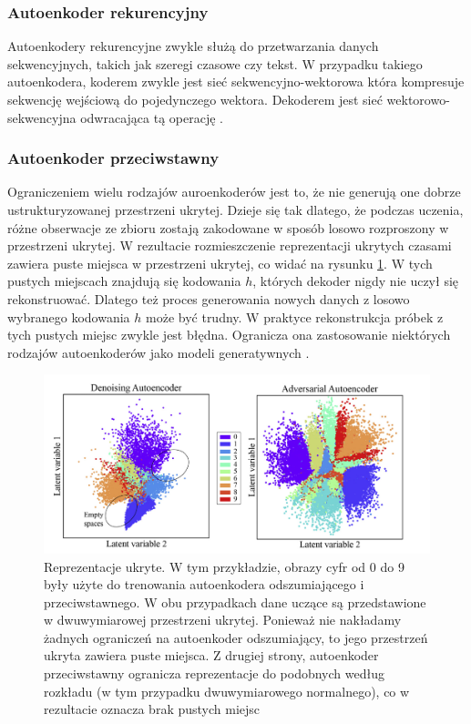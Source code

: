 \documentclass[12pt]{mwbk}
\theoremstyle{plain}
\theoremstyle{definition}
\theoremstyle{remark}
\newcommand\zrodlo[1]{\par\vspace{-3mm}{\small\textit{Źródło: }#1 }}
\begin{document}
\subsubsection{Autoenkoder rekurencyjny}

Autoenkodery rekurencyjne zwykle służą do przetwarzania danych sekwencyjnych, takich jak szeregi czasowe czy tekst. W przypadku takiego autoenkodera, koderem zwykle jest sieć sekwencyjno-wektorowa która kompresuje sekwencję wejściową do pojedynczego wektora. Dekoderem jest sieć wektorowo-sekwencyjna odwracająca tą operację \cite{geron}.






\subsubsection{Autoenkoder przeciwstawny}



Ograniczeniem wielu rodzajów auroenkoderów jest to, że nie generują one dobrze ustrukturyzowanej przestrzeni ukrytej. Dzieje się tak dlatego, że podczas uczenia, różne obserwacje ze zbioru zostają zakodowane w sposób losowo rozproszony w przestrzeni ukrytej. W rezultacie rozmieszczenie reprezentacji ukrytych czasami zawiera puste miejsca w przestrzeni ukrytej, co widać na rysunku \ref{fig:latent-spaces}. W tych pustych miejscach znajdują się kodowania $h$, których dekoder nigdy nie uczył się rekonstruować. Dlatego też proces generowania nowych danych z losowo wybranego kodowania $h$ może być trudny. W praktyce rekonstrukcja próbek z tych pustych miejsc zwykle jest błędna. Ogranicza ona zastosowanie niektórych rodzajów autoenkoderów jako modeli generatywnych \cite{pinaya}.


\begin{figure}[!h]
	\centering
	\includegraphics[width=\linewidth]{rys/adversial_autoencoder.png}
	\caption{Reprezentacje ukryte. W tym przykładzie, obrazy cyfr od 0 do 9 były użyte do trenowania autoenkodera odszumiającego i przeciwstawnego. W obu przypadkach dane uczące są przedstawione w dwuwymiarowej przestrzeni ukrytej. Ponieważ nie nakładamy żadnych ograniczeń na autoenkoder odszumiający, to jego przestrzeń ukryta zawiera puste miejsca. Z drugiej strony, autoenkoder przeciwstawny ogranicza reprezentacje do podobnych według rozkładu (w tym przypadku dwuwymiarowego normalnego), co w rezultacie oznacza brak pustych miejsc}
	\zrodlo{\cite{pinaya}}
	\label{fig:latent-spaces}
\end{figure}
\end{document}
